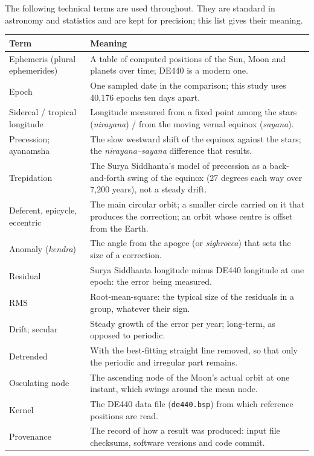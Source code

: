 \documentclass[11pt,a4paper]{article}
\newcommand{\toprule}{\hline\hline}%
\newcommand{\midrule}{\hline}%
\newcommand{\file}[1]{\texttt{#1}}
\begin{document}
The following technical terms are used throughout. They are standard in astronomy and statistics and are kept for precision; this list gives their meaning.

{\small
\begin{longtable}{@{}>{\raggedright\arraybackslash}p{}>{\raggedright\arraybackslash}p{}@{}}
\toprule
Term & Meaning \\
\midrule
\endhead
Ephemeris (plural ephemerides) & A table of computed positions of the Sun, Moon and planets over time; DE440 is a modern one. \\
Epoch & One sampled date in the comparison; this study uses 40,176 epochs ten days apart. \\
Sidereal / tropical longitude & Longitude measured from a fixed point among the stars (\textit{nirayana}) / from the moving vernal equinox (\textit{sayana}). \\
Precession; ayanamsha & The slow westward shift of the equinox against the stars; the \textit{nirayana--sayana} difference that results. \\
Trepidation & The Surya Siddhanta's model of precession as a back-and-forth swing of the equinox (27 degrees each way over 7,200 years), not a steady drift. \\
Deferent, epicycle, eccentric & The main circular orbit; a smaller circle carried on it that produces the correction; an orbit whose centre is offset from the Earth. \\
Anomaly (\textit{kendra}) & The angle from the apogee (or \textit{sighrocca}) that sets the size of a correction. \\
Residual & Surya Siddhanta longitude minus DE440 longitude at one epoch: the error being measured. \\
RMS & Root-mean-square: the typical size of the residuals in a group, whatever their sign. \\
Drift; secular & Steady growth of the error per year; long-term, as opposed to periodic. \\
Detrended & With the best-fitting straight line removed, so that only the periodic and irregular part remains. \\
Osculating node & The ascending node of the Moon's actual orbit at one instant, which swings around the mean node. \\
Kernel & The DE440 data file (\file{de440.bsp}) from which reference positions are read. \\
Provenance & The record of how a result was produced: input file checksums, software versions and code commit. \\

\end{longtable}}
\end{document}

